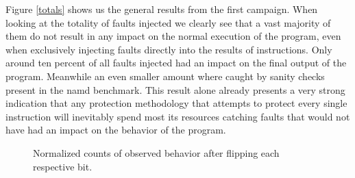 \documentclass[lettersize,journal]{IEEEtran}
\begin{document}
Figure \ref{totals} shows us the general results from the first campaign. When looking at the totality of faults injected we clearly see that a vast majority of them do not result in any impact on the normal execution of the program, even when exclusively injecting faults directly into the results of instructions. Only around ten percent of all faults injected had an impact on the final output of the program. Meanwhile an even smaller amount where caught by sanity checks present in the namd benchmark. This result alone already presents a very strong indication that any protection methodology that attempts to protect every single instruction will inevitably spend most its resources catching faults that would not have had an impact on the behavior of the program.\\
\begin{figure}[!t] 
    \centering
\caption{Normalized counts of observed behavior after flipping each respective bit.}
\label{perbits}
\end{figure}
\end{document}
